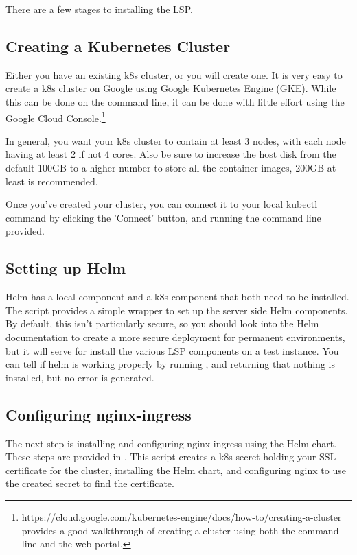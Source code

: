 \documentclass[11pt,twoside]{article}
\begin{document}
There are a few stages to installing the LSP.

\subsection{Creating a Kubernetes Cluster}

Either you have an existing k8s cluster, or you will create one.  It is very
easy to create a k8s cluster on Google using Google Kubernetes Engine (GKE).
While this can be done on the command line, it can be done with little effort
using the Google Cloud Console.\footnote{https://cloud.google.com/kubernetes-engine/docs/how-to/creating-a-cluster
provides a good walkthrough of creating a cluster using both the command line
and the web portal.}

In general, you want your k8s cluster to contain at least 3 nodes, with each node
having at least 2 if not 4 cores.  Also be sure to increase the host disk from
the default 100GB to a higher number to store all the container images,
200GB at least is recommended.

Once you've created your cluster, you can connect it to your local kubectl
command by clicking the 'Connect' button, and running the command line provided.

\subsection{Setting up Helm}

Helm has a local component and a k8s component that both need to be installed.
The  script provides a simple wrapper to set up the
server side Helm components.
By default, this isn't particularly secure, so you should look into the Helm
documentation to create a more secure deployment for permanent environments,
but it will serve for install the various LSP components on a test instance.
You can tell if helm is working properly by running , and returning that nothing
is installed, but no error is generated.

\subsection{Configuring nginx-ingress}

The next step is installing and configuring nginx-ingress using the Helm chart.
These steps are provided in .  This script creates
a k8s secret holding your SSL certificate for the cluster, installing the Helm
chart, and configuring nginx to use the created secret to find the certificate.
\end{document}
